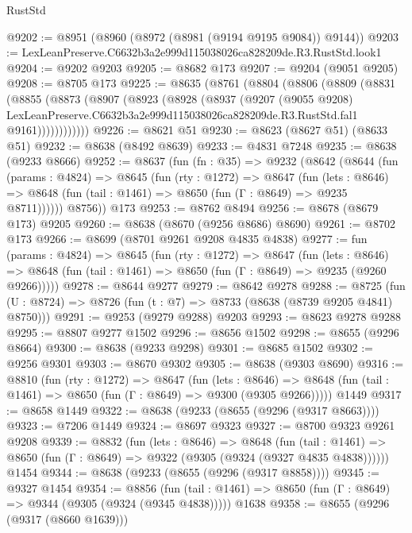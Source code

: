 \begin{lexlean}{RustStd}
\begin{coremodule}
@9202 := @8951 (@8960 (@8972 (@8981 (@9194 @9195 @9084)) @9144))
@9203 := LexLeanPreserve.C6632b3a2e999d115038026ca828209de.R3.RustStd.look1
@9204 := @9202 @9203
@9205 := @8682 @173
@9207 := @9204 (@9051 @9205)
@9208 := @8705 @173
@9225 := @8635
    (@8761
      (@8804
        (@8806
          (@8809
            (@8831
              (@8855
                (@8873
                  (@8907
                    (@8923
                      (@8928
                        (@8937
                          (@9207
                            (@9055 @9208)
                            LexLeanPreserve.C6632b3a2e999d115038026ca828209de.R3.RustStd.fal1
                            @9161))))))))))))
@9226 := @8621 @51
@9230 := @8623 (@8627 @51) (@8633 @51)
@9232 := @8638 (@8492 @8639)
@9233 := @4831 @7248
@9235 := @8638 (@9233 @8666)
@9252 := @8637
    (fun (fn : @35) =>
    @9232
      (@8642
        (@8644
          (fun (params : @4824) =>
          @8645
            (fun (rty : @1272) =>
            @8647
              (fun (lets : @8646) =>
              @8648 (fun (tail : @1461) => @8650 (fun (Γ : @8649) => @9235 @8711))))))
        @8756))
    @173
@9253 := @8762 @8494
@9256 := @8678 (@8679 @173) @9205
@9260 := @8638 (@8670 (@9256 @8686) @8690)
@9261 := @8702 @173
@9266 := @8699 (@8701 @9261 @9208 @4835 @4838)
@9277 := fun (params : @4824) =>
  @8645
    (fun (rty : @1272) =>
    @8647
      (fun (lets : @8646) =>
      @8648 (fun (tail : @1461) => @8650 (fun (Γ : @8649) => @9235 (@9260 @9266)))))
@9278 := @8644 @9277
@9279 := @8642 @9278
@9288 := @8725 (fun (U : @8724) => @8726 (fun (t : @7) => @8733 (@8638 (@8739 @9205 @4841) @8750)))
@9291 := @9253 (@9279 @9288) @9203
@9293 := @8623 @9278 @9288
@9295 := @8807 @9277 @1502
@9296 := @8656 @1502
@9298 := @8655 (@9296 @8664)
@9300 := @8638 (@9233 @9298)
@9301 := @8685 @1502
@9302 := @9256 @9301
@9303 := @8670 @9302
@9305 := @8638 (@9303 @8690)
@9316 := @8810
    (fun (rty : @1272) =>
    @8647
      (fun (lets : @8646) =>
      @8648 (fun (tail : @1461) => @8650 (fun (Γ : @8649) => @9300 (@9305 @9266)))))
    @1449
@9317 := @8658 @1449
@9322 := @8638 (@9233 (@8655 (@9296 (@9317 @8663))))
@9323 := @7206 @1449
@9324 := @8697 @9323
@9327 := @8700 @9323 @9261 @9208
@9339 := @8832
    (fun (lets : @8646) =>
    @8648
      (fun (tail : @1461) => @8650 (fun (Γ : @8649) => @9322 (@9305 (@9324 (@9327 @4835 @4838))))))
    @1454
@9344 := @8638 (@9233 (@8655 (@9296 (@9317 @8858))))
@9345 := @9327 @1454
@9354 := @8856
    (fun (tail : @1461) => @8650 (fun (Γ : @8649) => @9344 (@9305 (@9324 (@9345 @4838)))))
    @1638
@9358 := @8655 (@9296 (@9317 (@8660 @1639)))

\end{coremodule}
\end{lexlean}
